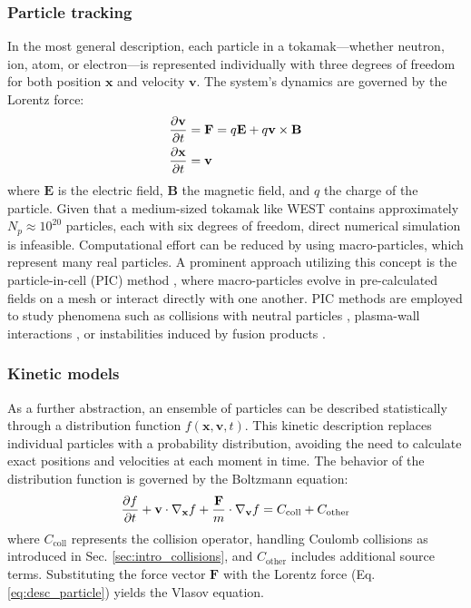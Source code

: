 \subsubsection{Particle tracking}
\label{ssec:desc_particleTracking}
In the most general description, each particle in a tokamak—whether neutron, ion, atom, or electron—is represented individually with three degrees of freedom for both position $\mathbf{x}$ and velocity $\mathbf{v}$. The system's dynamics are governed by the Lorentz force:
\begin{align}
	\pdv{\mathbf{v}}{t} &= \mathbf{F} = q\mathbf{E} + q\mathbf{v} \times \mathbf{B} \label{eq:desc_particle}\\
	\pdv{\mathbf{x}}{t} &= \mathbf{v}
\end{align}
where $\mathbf{E}$ is the electric field, $\mathbf{B}$ the magnetic field, and $q$ the charge of the particle. \newline
Given that a medium-sized tokamak like WEST contains approximately $N_p \approx 10^{20}$ particles, each with six degrees of freedom, direct numerical simulation is infeasible. Computational effort can be reduced by using macro-particles, which represent many real particles. A prominent approach utilizing this concept is the particle-in-cell (PIC) method \cite{tskhakaya2007particle}, where macro-particles evolve in pre-calculated fields on a mesh or interact directly with one another. PIC methods are employed to study phenomena such as collisions with neutral particles \cite{birdsall1991particle}, plasma-wall interactions \cite{khaziev2018hpic}, or instabilities induced by fusion products \cite{cook2013particle}.



\subsubsection{Kinetic models}
\label{ssec:desc_kineticModels}
As a further abstraction, an ensemble of particles can be described statistically through a distribution function $f(\mathbf{x}, \mathbf{v},t)$. This kinetic description replaces individual particles with a probability distribution, avoiding the need to calculate exact positions and velocities at each moment in time. The behavior of the distribution function is governed by the Boltzmann equation:
\begin{equation}
	\label{eq:BoltzmannEquationKineticDescription}
	\pdv{f}{t} + \mathbf{v} \cdot \nabla_{\mathbf{x}} f + \frac{\mathbf{F}}{m} \cdot \nabla_{\mathbf{v}} f = C_{\text{coll}} + C_{\text{other}}
\end{equation}
where $C_{\text{coll}}$ represents the collision operator, handling Coulomb collisions as introduced in Sec. \ref{sec:intro_collisions}, and $C_{\text{other}}$ includes additional source terms. Substituting the force vector $\mathbf{F}$ with the Lorentz force (Eq. \ref{eq:desc_particle}) yields the Vlasov equation. \newline

